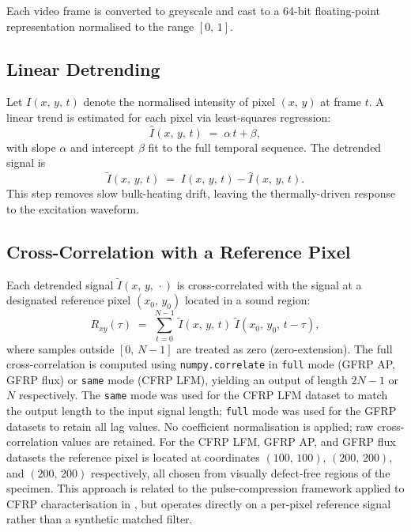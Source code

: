 \documentclass[conference]{IEEEtran}
\begin{document}
  Each video frame is converted to greyscale and cast to a 64-bit
  floating-point representation normalised to the range $[0,\,1]$.

  \subsection{Linear Detrending}

  Let $I(x,\,y,\,t)$ denote the normalised intensity of pixel $(x,\,y)$ at
  frame $t$. A linear trend is estimated for each pixel via least-squares
  regression:
  \begin{equation}
      \hat{I}(x,\,y,\,t) \;=\; \alpha\,t + \beta,
  \end{equation}
  with slope $\alpha$ and intercept $\beta$ fit to the full temporal sequence.
  The detrended signal is
  \begin{equation}
      \tilde{I}(x,\,y,\,t) \;=\; I(x,\,y,\,t) - \hat{I}(x,\,y,\,t).
  \end{equation}
  This step removes slow bulk-heating drift, leaving the thermally-driven
  response to the excitation waveform.

  \subsection{Cross-Correlation with a Reference Pixel}

  Each detrended signal $\tilde{I}(x,\,y,\,\cdot)$ is cross-correlated with the
  signal at a designated reference pixel $(x_0,\,y_0)$ located in a
  sound region:
  \begin{equation}
      R_{xy}(\tau) \;=\; \sum_{t=0}^{N-1}\,
      \tilde{I}(x,\,y,\,t)\;\tilde{I}(x_0,\,y_0,\,t - \tau),
  \end{equation}
  where samples outside $[0,\,N-1]$ are treated as zero (zero-extension).
  The full cross-correlation is computed using \texttt{numpy.correlate} in
  \texttt{full} mode (GFRP AP, GFRP flux) or \texttt{same} mode (CFRP LFM),
  yielding an output of length $2N-1$ or $N$ respectively. The \texttt{same}
  mode was used for the CFRP LFM dataset to match the output length to the
  input signal length; \texttt{full} mode was used for the GFRP datasets to
  retain all lag values. No coefficient normalisation is applied; raw
  cross-correlation values are retained.
  For the CFRP LFM, GFRP AP, and GFRP flux datasets the reference pixel is
  located at coordinates $(100,\,100)$, $(200,\,200)$, and $(200,\,200)$
  respectively, all chosen from visually defect-free regions of the specimen.
  This approach is related to the pulse-compression framework applied to
  CFRP characterisation in \cite{mulaveesala2011}, but operates directly on
  a per-pixel reference signal rather than a synthetic matched filter.
\end{document}
